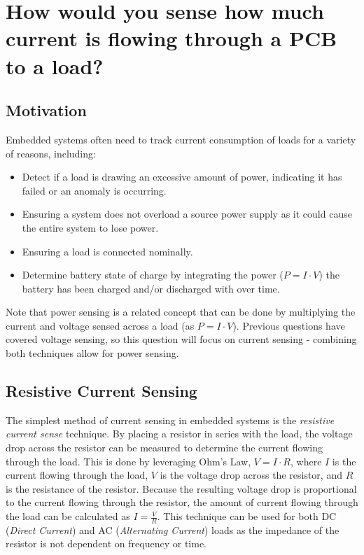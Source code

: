 \documentclass[main.tex]{subfiles}
\begin{document}
\section{How would you sense how much current is flowing through a PCB to a load?}


\spoilerline

\subsection{Motivation}
Embedded systems often need to track current consumption of loads for a variety of reasons, including:
\begin{itemize}
    \item Detect if a load is drawing an excessive amount of power, indicating it has failed or an anomaly is occurring. 
    \item Ensuring a system does not overload a source power supply as it could cause the entire system to lose power. 
    \item Ensuring a load is connected nominally.
    \item Determine battery state of charge by integrating the power ($P = I \cdot V$) the battery has been charged and/or discharged with over time.
\end{itemize}

\noindent Note that power sensing is a related concept that can be done by multiplying the current and voltage sensed across a load (as $P=I \cdot V$). Previous questions have covered voltage sensing, so this question will focus on current sensing - combining both techniques allow for power sensing.

\subsection{Resistive Current Sensing}
The simplest method of current sensing in embedded systems is the \textit{resistive current sense} technique. By placing a resistor in series with the load, the voltage drop across the resistor can be measured to determine the current flowing through the load. This is done by leveraging Ohm's Law, $V = I \cdot R$, where $I$ is the current flowing through the load, $V$ is the voltage drop across the resistor, and $R$ is the resistance of the resistor. Because the resulting voltage drop is proportional to the current flowing through the resistor, the amount of current flowing through the load can be calculated as $I = \frac{V}{R}$. This technique can be used for both DC (\textit{Direct Current}) and AC (\textit{Alternating Current}) loads as the impedance of the resistor is not dependent on frequency or time.
\end{document}
